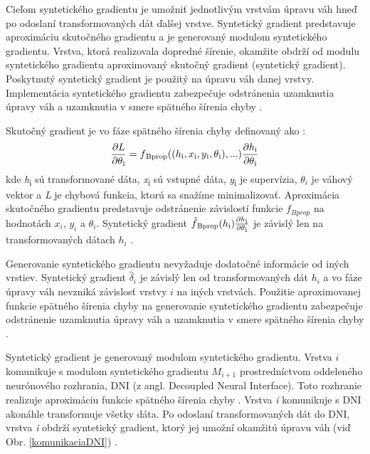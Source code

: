Cieľom syntetického gradientu je umožniť jednotlivým vrstvám úpravu váh hneď po odoslaní transformovaných dát ďalšej vrstve. Syntetický gradient predstavuje aproximáciu skutočného gradientu a je generovaný modulom syntetického gradientu. Vrstva, ktorá realizovala dopredné šírenie, okamžite obdrží od modulu syntetického gradientu aproximovaný skutočný gradient (syntetický gradient). Poskytnutý syntetický gradient je použitý na úpravu váh danej vrstvy. Implementácia syntetického gradientu zabezpečuje odstránenia uzamknutia úpravy váh a uzamknutia v smere spätného šírenia chyby \cite{Jaderberg2016}. 

Skutočný gradient je vo fáze spätného šírenia chyby definovaný ako \cite{Goh1995, Jaderberg2016}:
\begin{equation}
    \frac{\partial L}{\partial \theta \textsubscript{i}} = f\textsubscript{Bprop}((h\textsubscript{i},x\textsubscript{i},y\textsubscript{i},\theta\textsubscript{i}),...)\frac{\partial h\textsubscript{i}}{\partial \theta \textsubscript{i}}
\end{equation}
kde \textit{h}\textsubscript{i} sú transformované dáta, \textit{x}\textsubscript{i} sú vstupné dáta, \textit{y}\textsubscript{i} je supervízia, $\theta_i$ je váhový vektor a \textit{L} je chybová funkcia, ktorú sa snažíme minimalizovať. Aproximácia skutočného gradientu predstavuje odstránenie závislostí funkcie $f_{Bprop}$ na hodnotách $x_i$, $y_i$ a $\theta_i$. Syntetický gradient $\hat{f}\textsubscript{Bprop}(h\textsubscript{i})\frac{\partial h\textsubscript{i}}{\partial \theta \textsubscript{i}} $
je závislý len na transformovaných dátach $h_i$ \cite{Jaderberg2016}.  

Generovanie syntetického gradientu nevyžaduje dodatočné informácie od iných vrstiev. Syntetický gradient $\hat{\delta}_i$ je závislý len od transformovaných dát $h_i$ a vo fáze úpravy váh nevzniká závislosť vrstvy $i$ na iných vrstvách. Použitie aproximovanej funkcie spätného šírenia chyby na generovanie syntetického gradientu zabezpečuje odstránenie uzamknutia úpravy váh a uzamknutia v smere spätného šírenia chyby \cite{Jaderberg2016}.

Syntetický gradient je generovaný modulom syntetického gradientu. Vrstva $i$ komunikuje s modulom syntetického gradientu $M_{i+1}$ prostredníctvom oddeleného neurónového rozhrania, DNI (z angl. Decoupled Neural Interface). Toto rozhranie realizuje aproximáciu funkcie spätného šírenia chyby \cite{Czarnecki2017}. Vrstva \textit{i} komunikuje s DNI akonáhle transformuje všetky dáta. Po odoslaní transformovaných dát do DNI, vrstva \textit{i} obdrží syntetický gradient, ktorý jej umožní okamžitú úpravu váh (viď Obr. \ref{komunikaciaDNI}) \cite{Jaderberg2016}.

